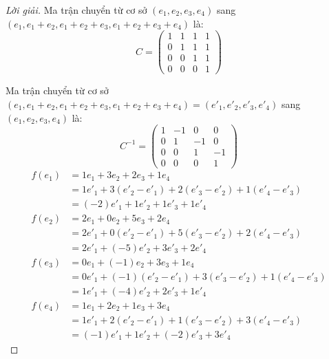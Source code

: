 \documentclass[class=linearalgebra,crop=false]{standalone}
\begin{document}
\begin{proof}[Lời giải]
    Ma trận chuyển từ cơ sở $(e_{1}, e_{2}, e_{3}, e_{4})$ sang $(e_{1}, e_{1} + e_{2}, e_{1} + e_{2} + e_{3}, e_{1} + e_{2} + e_{3} + e_{4})$ là:
    \[
        C =
        \begin{pmatrix}
            1 & 1 & 1 & 1 \\
            0 & 1 & 1 & 1 \\
            0 & 0 & 1 & 1 \\
            0 & 0 & 0 & 1
        \end{pmatrix}
    \]
    \par Ma trận chuyển từ cơ sở $(e_{1}, e_{1} + e_{2}, e_{1} + e_{2} + e_{3}, e_{1} + e_{2} + e_{3} + e_{4}) = (e'_{1}, e'_{2}, e'_{3}, e'_{4})$ sang $(e_{1}, e_{2}, e_{3}, e_{4})$ là:
    \[
        C^{-1} =
        \begin{pmatrix}
            1 & -1 & 0  & 0  \\
            0 & 1  & -1 & 0  \\
            0 & 0  & 1  & -1 \\
            0 & 0  & 0  & 1
        \end{pmatrix}
    \]
    \begin{align*}
        f(e_{1}) & = 1e_{1} + 3e_{2} + 2e_{3} + 1e_{4} \\
                 & = 1e'_{1} + 3(e'_{2} - e'_{1}) + 2(e'_{3} - e'_{2}) + 1(e'_{4} - e'_{3}) \\
                 & = (-2)e'_{1} + 1e'_{2} + 1e'_{3} + 1e'_{4} \\
        f(e_{2}) & = 2e_{1} + 0e_{2} + 5e_{3} + 2e_{4} \\
                 & = 2e'_{1} + 0(e'_{2} - e'_{1}) + 5(e'_{3} - e'_{2}) + 2(e'_{4} - e'_{3}) \\
                 & = 2e'_{1} + (-5)e'_{2} + 3e'_{3} + 2e'_{4} \\
        f(e_{3}) & = 0e_{1} + (-1)e_{2} + 3e_{3} + 1e_{4} \\
                 & = 0e'_{1} + (-1)(e'_{2} - e'_{1}) + 3(e'_{3} - e'_{2}) + 1(e'_{4} - e'_{3}) \\
                 & = 1e'_{1} + (-4)e'_{2} + 2e'_{3} + 1e'_{4} \\
        f(e_{4}) & = 1e_{1} + 2e_{2} + 1e_{3} + 3e_{4} \\
                 & = 1e'_{1} + 2(e'_{2} - e'_{1}) + 1(e'_{3} - e'_{2}) + 3(e'_{4} - e'_{3}) \\
                 & = (-1)e'_{1} + 1e'_{2} + (-2)e'_{3} + 3e'_{4}

\end{align*}
\end{proof}
\end{document}
